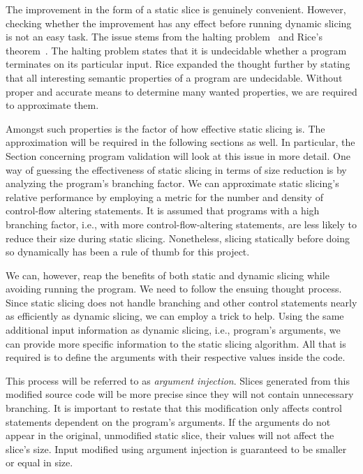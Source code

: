 The improvement in the form of a static slice is genuinely convenient.  
However, checking whether the improvement has any effect before running 
dynamic slicing is not an easy task.  
The issue stems from the halting problem~\citep{Turing36} and 
Rice's theorem~\citep{Rice53}.  
The halting problem states that it is undecidable whether a program 
terminates on its particular input.  
Rice expanded the thought further by stating that all interesting semantic 
properties of a program are undecidable. 
Without proper and accurate means to determine many wanted properties, we 
are required to approximate them. 

Amongst such properties is the factor of how effective static slicing is.  
The approximation will be required in the following sections as well.  
In particular, the Section concerning program validation will look at this 
issue in more detail.  
One way of guessing the effectiveness of static slicing in terms of size 
reduction is by analyzing the program's branching factor. 
We can approximate static slicing's relative performance by employing 
a metric for the number and density of control-flow altering statements.  
It is assumed that programs with a high branching factor, i.e., with more 
control-flow-altering statements, are less likely to reduce their size 
during static slicing.
Nonetheless, slicing statically before doing so dynamically has been a rule 
of thumb for this project.  

We can, however, reap the benefits of both static and dynamic slicing while 
avoiding running the program. 
We need to follow the ensuing thought process. 
Since static slicing does not handle branching and other control statements 
nearly as efficiently as dynamic slicing, we can employ a trick to help.  
Using the same additional input information as dynamic slicing, i.e., 
program's arguments, we can provide more specific information to the static 
slicing algorithm.  
All that is required is to define the arguments with their respective values 
inside the code. 

This process will be referred to as \emph{argument injection}. 
Slices generated from this modified source code will be more precise since 
they will not contain unnecessary branching.  
It is important to restate that this modification only affects control 
statements dependent on the program's arguments.  
If the arguments do not appear in the original, unmodified static slice, 
their values will not affect the slice's size.  
Input modified using argument injection is guaranteed to be smaller or equal 
in size.

